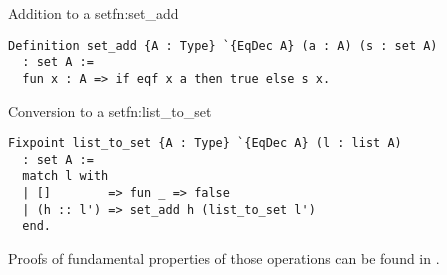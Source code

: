 \begin{func}{Addition to a set}{fn:set_add}
\begin{verbatim}
Definition set_add {A : Type} `{EqDec A} (a : A) (s : set A)  
  : set A :=
  fun x : A => if eqf x a then true else s x.
\end{verbatim}
\end{func}
\begin{func}{Conversion to a set}{fn:list_to_set}
\begin{verbatim}
Fixpoint list_to_set {A : Type} `{EqDec A} (l : list A) 
  : set A :=
  match l with
  | []        => fun _ => false
  | (h :: l') => set_add h (list_to_set l')
  end.
\end{verbatim}
\end{func}
Proofs of fundamental properties of those operations can be found in .